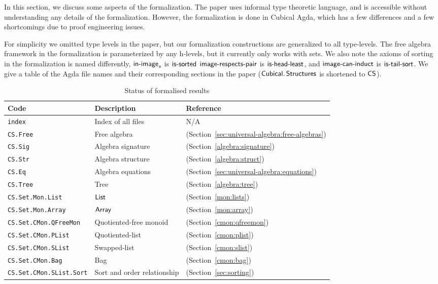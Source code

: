 \label{sec:formalization}

In this section, we discuss some aspects of the formalization.
The paper uses informal type theoretic language,
and is accessible without understanding any details of the formalization.
However, the formalization is done in Cubical Agda, which has a few differences and a few
shortcomings due to proof engineering issues.

For simplicity we omitted type levels in the paper, but our formalization constructions
are generalized to all type-levels.
The free algebra framework in the formalization is
parameterized by any h-levels, but it currently only works with sets.
We also note the axioms of sorting in the formalization is named differently,
$\operatorname{\mathsf{in-image}}_s$ is $\operatorname{\mathsf{is-sorted}}$
$\operatorname{\mathsf{image-respects-pair}}$ is $\operatorname{\mathsf{is-head-least}}$, and
$\operatorname{\mathsf{image-can-induct}}$ is $\operatorname{\mathsf{is-tail-sort}}$.
We give a table of the Agda file names and their corresponding sections
in the paper ($\operatorname{\mathsf{Cubical.Structures}}$ is shortened to $\operatorname{\mathsf{CS}}$).

\begin{table}[h]\label{appendix:formalizations}
\centering
\begin{tabular}{lll}
\hline
\textbf{Code} & \textbf{Description} & \textbf{Reference}               \\ \hline
\texttt{index} & Index of all files & N/A \\
\texttt{CS.Free}         & Free algebra            & (Section~\cref{sec:universal-algebra:free-algebras}) \\
\texttt{CS.Sig}         & Algebra signature            & (Section~\cref{algebra:signature}) \\
\texttt{CS.Str}         & Algebra structure            & (Section~\cref{algebra:struct}) \\
\texttt{CS.Eq}         & Algebra equations            & (Section~\cref{sec:universal-algebra:equations}) \\
\texttt{CS.Tree}         & Tree     & (Section~\cref{algebra:tree}) \\
\texttt{CS.Set.Mon.List} & $\operatorname{\mathsf{List}}$  & (Section~\cref{mon:lists}) \\
\texttt{CS.Set.Mon.Array} & $\operatorname{\mathsf{Array}}$  & (Section~\cref{mon:array})\\
\texttt{CS.Set.CMon.QFreeMon} & Quotiented-free monoid & (Section~\cref{cmon:qfreemon}) \\
\texttt{CS.Set.CMon.PList} & Quotiented-list & (Section~\cref{cmon:plist}) \\
\texttt{CS.Set.CMon.SList} & Swapped-list & (Section~\cref{cmon:slist}) \\
\texttt{CS.Set.CMon.Bag} & Bag & (Section~\cref{cmon:bag}) \\
\texttt{CS.Set.CMon.SList.Sort} & Sort and order relationship & (Section~\cref{sec:sorting}) \\
\hline
\end{tabular}
\caption{Status of formalised results}
\label{tab:formalised_results}
\end{table}
